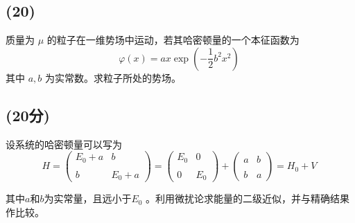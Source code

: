 \subsection{(20)}
质量为 $\mu$ 的粒子在一维势场中运动，若其哈密顿量的一个本征函数为
\[
\varphi(x) = a x \exp \left( -\frac{1}{2}b^2 x^2 \right)~
\]
其中 $a, b$ 为实常数。求粒子所处的势场。
\subsection{(20分)}
设系统的哈密顿量可以写为
\begin{equation}
H = \begin{pmatrix} E_0 + a & b \\\\ b & E_0 + a \end{pmatrix}
= \begin{pmatrix} E_0 & 0 \\\\ 0 & E_0 \end{pmatrix}
+ \begin{pmatrix} a & b \\\\ b & a \end{pmatrix} = H_0 + V~
\end{equation}

其中$a$和$b$为实常量，且远小于$E_0$ 。利用微扰论求能量的二级近似，并与精确结果作比较。
